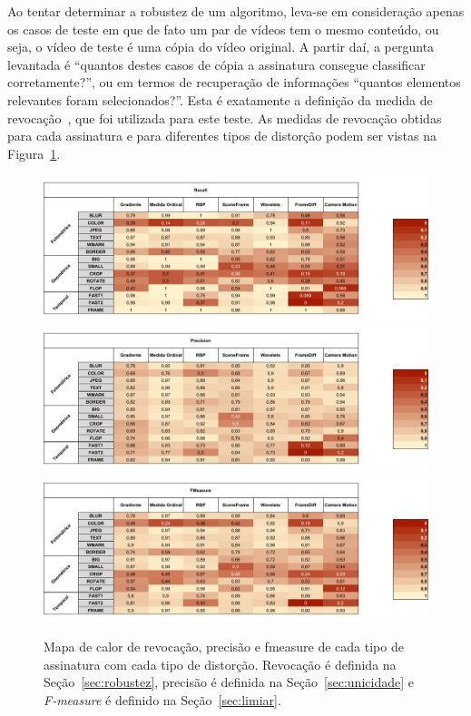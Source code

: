 Ao tentar determinar a robustez de um algoritmo, leva-se em consideração apenas os casos de teste em que de fato um par de vídeos tem o mesmo conteúdo, ou seja, o vídeo de teste é uma cópia do vídeo original. A partir daí, a pergunta levantada é ``quantos destes casos de cópia a assinatura consegue classificar corretamente?'', ou em termos de recuperação de informações ``quantos elementos relevantes foram selecionados?''. Esta é exatamente a definição da medida de revocação~\cite{Ting2010}, que foi utilizada para este teste. As medidas de revocação obtidas para cada assinatura e para diferentes tipos de distorção podem ser vistas na Figura~\ref{fig:heatmap-comparacoes}.


\begin{figure}[h]
	\centering
	\caption{Mapa de calor de revocação, precisão e fmeasure de cada tipo de assinatura com cada tipo de distorção. Revocação é definida na Seção~\ref{sec:robustez}, precisão é definida na Seção~\ref{sec:unicidade} e \textit{F-measure} é definido na Seção~\ref{sec:limiar}.}
	\label{fig:heatmap-comparacoes}
	\includegraphics[width=\textwidth]{dados/figuras/experimentos/before_recall.pdf}
	\includegraphics[width=\textwidth]{dados/figuras/experimentos/before_precision.pdf}
	\includegraphics[width=\textwidth]{dados/figuras/experimentos/before_fmeasure.pdf}	
\end{figure}


